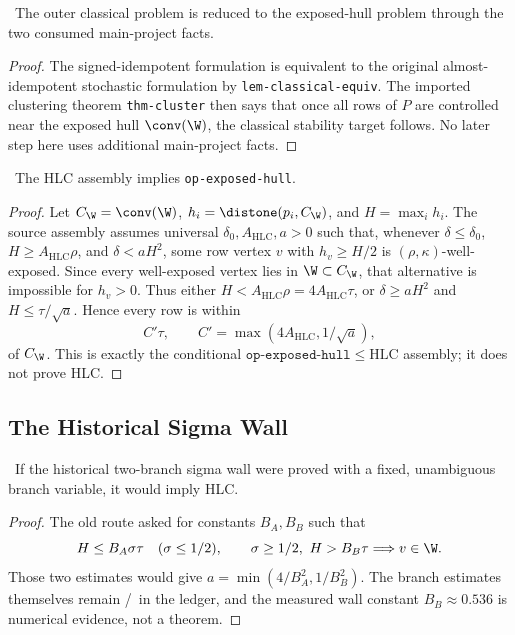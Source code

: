 \begin{proposition}
\provedbadge\  The outer classical problem is reduced to the exposed-hull
problem through the two consumed main-project facts.
\end{proposition}
\begin{proof}
The signed-idempotent formulation is equivalent to the original
almost-idempotent stochastic formulation by \texttt{lem-classical-equiv}.  The
imported clustering theorem \texttt{thm-cluster} then says that once all rows
of \(P\) are controlled near the exposed hull \(\conv(\W)\), the classical
stability target follows.  No later step here uses additional main-project
facts.
\end{proof}

\begin{proposition}
\modauditbadge\  The HLC assembly implies \texttt{op-exposed-hull}.
\end{proposition}
\begin{proof}
Let \(C_{\W}=\conv(\W)\), \(h_i=\distone(p_i,C_{\W})\), and
\(H=\max_i h_i\).  The source assembly assumes universal
\(\delta_0,A_{\mathrm{HLC}},a>0\) such that, whenever
\(\delta\leq\delta_0\), \(H\geq A_{\mathrm{HLC}}\rho\), and
\(\delta<aH^2\), some row vertex \(v\) with \(h_v\geq H/2\) is
\((\rho,\kappa)\)-well-exposed.  Since every well-exposed vertex lies in
\(\W\subset C_{\W}\), that alternative is impossible for \(h_v>0\).
Thus either \(H<A_{\mathrm{HLC}}\rho=4A_{\mathrm{HLC}}\tau\), or
\(\delta\geq aH^2\) and \(H\leq\tau/\sqrt a\).  Hence every row is within
\[
  C'\tau,\qquad C'=\max(4A_{\mathrm{HLC}},1/\sqrt a),
\]
of \(C_{\W}\).  This is exactly the conditional
\(\texttt{op-exposed-hull}\leq\mathrm{HLC}\) assembly; it does not prove HLC.
\end{proof}

\subsection{The Historical Sigma Wall}
\begin{proposition}
\modauditbadge\  If the historical two-branch sigma wall were proved with a
fixed, unambiguous branch variable, it would imply HLC.
\end{proposition}
\begin{proof}
The old route asked for constants \(B_A,B_B\) such that
\[
H\leq B_A\sigma\tau \quad(\sigma\leq 1/2),
\qquad
\sigma\geq1/2,\ H>B_B\tau \Longrightarrow v\in\W .
\]
Those two estimates would give \(a=\min(4/B_A^2,1/B_B^2)\).  The branch
estimates themselves remain \openbadge/\numbadge\ in the ledger, and the
measured wall constant \(B_B\approx0.536\) is numerical evidence, not a
theorem.
\end{proof}

